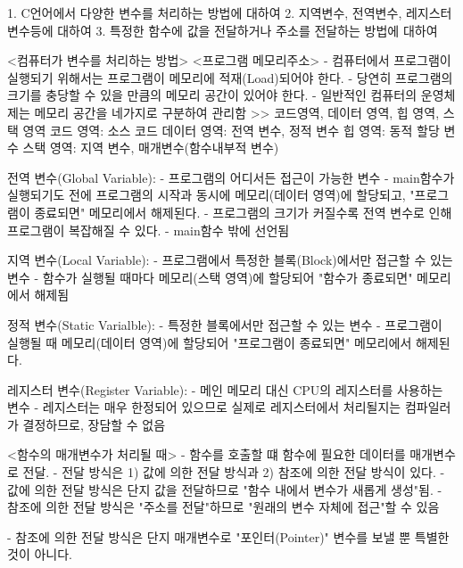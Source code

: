1. C언어에서 다양한 변수를 처리하는 방법에 대하여
2. 지역변수, 전역변수, 레지스터 변수등에 대하여
3. 특정한 함수에 값을 전달하거나 주소를 전달하는 방법에 대하여

<컴퓨터가 변수를 처리하는 방법>
    <프로그램 메모리주소>
        - 컴퓨터에서 프로그램이 실행되기 위해서는 프로그램이 메모리에 적재(Load)되어야 한다.
        - 당연히 프로그램의 크기를 충당할 수 있을 만큼의 메모리 공간이 있어야 한다.
        - 일반적인 컴퓨터의 운영체제는 메모리 공간을 네가지로 구분하여 관리함
        >>  코드영역, 데이터 영역, 힙 영역, 스택 영역
            코드 영역: 소스 코드
            데이터 영역: 전역 변수, 정적 변수
            힙 영역: 동적 할당 변수
            스택 영역: 지역 변수, 매개변수(함수내부적 변수)
        
            전역 변수(Global Variable):
                - 프로그램의 어디서든 접근이 가능한 변수
                - main함수가 실행되기도 전에 프로그램의 시작과 동시에 메모리(데이터 영역)에 할당되고, "프로그램이 종료되면" 메모리에서 해제된다.
                - 프로그램의 크기가 커질수록 전역 변수로 인해 프로그램이 복잡해질 수 있다.
                - main함수 밖에 선언됨

            지역 변수(Local Variable):
                -  프로그램에서 특정한 블록(Block)에서만 접근할 수 있는 변수
                - 함수가 실행될 때마다 메모리(스택 영역)에 할당되어 "함수가 종료되면" 메모리에서 해제됨

            정적 변수(Static Varialble):
                - 특정한 블록에서만 접근할 수 있는 변수
                - 프로그램이 실행될 때 메모리(데이터 영역)에 할당되어 "프로그램이 종료되면" 메모리에서 해제된다.

            레지스터 변수(Register Variable):
                - 메인 메모리 대신 CPU의 레지스터를 사용하는 변수
                - 레지스터는 매우 한정되어 있으므로 실제로 레지스터에서 처리될지는 컴파일러가 결정하므로, 장담할 수 없음

        <함수의 매개변수가 처리될 때>
            - 함수를 호출할 떄 함수에 필요한 데이터를 매개변수로 전달.
            - 전달 방식은 1) 값에 의한 전달 방식과 2) 참조에 의한 전달 방식이 있다.
            - 값에 의한 전달 방식은 단지 값을 전달하므로 "함수 내에서 변수가 새롭게 생성"됨.
            - 참조에 의한 전달 방식은 "주소를 전달"하므로 "원래의 변수 자체에 접근"할 수 있음

            - 참조에 의한 전달 방식은 단지 매개변수로 "포인터(Pointer)" 변수를 보낼 뿐 특별한 것이 아니다.
            